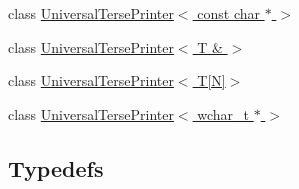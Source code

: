 \begin{DoxyCompactItemize}
class \hyperlink{classtesting_1_1internal_1_1_universal_terse_printer_3_01const_01char_01_5_01_4}{Universal\+Terse\+Printer$<$ const char $\ast$ $>$}
\item 
class \hyperlink{classtesting_1_1internal_1_1_universal_terse_printer_3_01_t_01_6_01_4}{Universal\+Terse\+Printer$<$ T \& $>$}
\item 
class \hyperlink{classtesting_1_1internal_1_1_universal_terse_printer_3_01_t[_n]_4}{Universal\+Terse\+Printer$<$ T\mbox{[}\+N\mbox{]}$>$}
\item 
class \hyperlink{classtesting_1_1internal_1_1_universal_terse_printer_3_01wchar__t_01_5_01_4}{Universal\+Terse\+Printer$<$ wchar\+\_\+t $\ast$ $>$}
\end{DoxyCompactItemize}
\subsection*{Typedefs}
